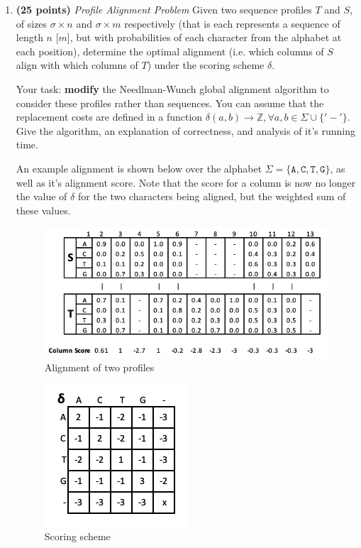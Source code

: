 \documentclass[11pt, oneside]{article}   	%
\begin{document}
\begin{enumerate}
\item \textbf{(25 points)} 
\emph{Profile Alignment Problem} Given two sequence profiles $T$ and $S$,  of sizes $\sigma \times n$ and $\sigma \times m$ respectively 
(that is each represents a sequence of length $n$ [$m$], but with probabilities of each character from the alphabet at each position), 
determine the optimal alignment (i.e. which columns of $S$ align with which columns of $T$) under the scoring scheme $\delta$.

Your task: \textbf{modify} the Needlman-Wunch global alignment algorithm to consider these profiles rather than sequences. 
You can assume that the replacement costs are defined in a function $\delta(a,b) \rightarrow \mathbb{Z} , \forall a,b \in \Sigma \cup \{'-'\}$.
Give the algorithm, an explanation of correctness, and analysis of it's running time. 

An example alignment is shown below over the alphabet $\Sigma=\{\texttt{A},\texttt{C},\texttt{T},\texttt{G}\}$, as well as it's alignment score. 
Note that the score for a column is now no longer the value of $\delta$ for the two characters being aligned, but the weighted sum of these values.


\begin{figure}[h!] %
\begin{centering}
\includegraphics{HW3_Align}
\caption{Alignment of two profiles}
\end{centering}
\end{figure}

\begin{figure}[h!]
\begin{centering}
\includegraphics{HW3_Delta}
\caption{Scoring scheme}
\end{centering}
\end{figure}


\end{enumerate}
\end{document}
